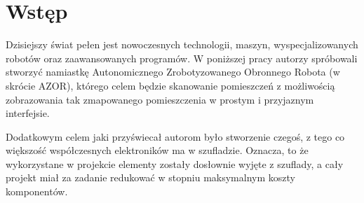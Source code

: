 \section*{Wstęp}
{}
    \tab Dzisiejszy świat pełen jest nowoczesnych technologii, maszyn, 
    wyspecjalizowanych robotów oraz zaawansowanych programów. 
    W poniższej pracy autorzy spróbowali stworzyć namiastkę 
    Autonomicznego Zrobotyzowanego Obronnego Robota (w skrócie AZOR), 
    którego celem będzie skanowanie pomieszczeń z możliwością zobrazowania tak zmapowanego pomieszczenia w prostym i przyjaznym interfejsie.

    Dodatkowym celem jaki przyświecał autorom było stworzenie czegoś, z tego co większość współczesnych elektroników ma w szufladzie.
    Oznacza, to że wykorzystane w projekcie elementy zostały dosłownie wyjęte z szuflady, a cały projekt miał za zadanie redukować w stopniu maksymalnym koszty komponentów.
